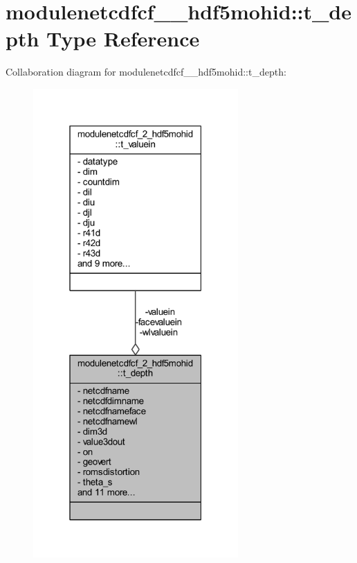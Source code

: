\hypertarget{structmodulenetcdfcf__2__hdf5mohid_1_1t__depth}{}\section{modulenetcdfcf\+\_\+\_\+hdf5mohid\+:\+:t\+\_\+depth Type Reference}
\label{structmodulenetcdfcf__2__hdf5mohid_1_1t__depth}


Collaboration diagram for modulenetcdfcf\+\_\+\_\+hdf5mohid\+:\+:t\+\_\+depth\+:\nopagebreak
\begin{figure}[H]
\begin{center}
\leavevmode
\includegraphics[width=222pt]{structmodulenetcdfcf__2__hdf5mohid_1_1t__depth__coll__graph}
\end{center}
\end{figure}
